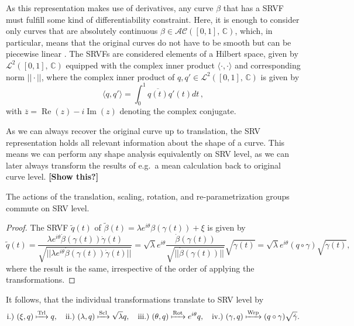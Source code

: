 \noindent As this representation makes use of derivatives, any curve $\beta$ that has a SRVF must fulfill some kind of differentiability constraint.
Here, it is enough to consider only curves that are absolutely continuous $\beta \in \mathcal{AC}([0,1],\, \mathbb{C})$, which, in particular, means that the original curves do not have to be smooth but can be piecewise linear \parencite[see][91]{SrivastavaKlassen2016}.
The SRVFs are considered elements of a Hilbert space, given by $\mathcal{L}^2([0,1],\,\mathbb{C})$ equipped with the complex inner product $\langle \cdot, \cdot \rangle$ and corresponding norm $||\cdot||$, where the complex inner product of $q,q' \in \mathcal{L}^2([0,1],\,\mathbb{C})$ is given by
$$ \langle q, q' \rangle = \int_0^1 \overline{q(t)} q'(t) dt \,, $$
with $\overline{z} = \operatorname{Re}(z) - i \operatorname{Im}(z)$ denoting the complex conjugate.

As we can always recover the original curve up to translation, the SRV representation holds all relevant information about the shape of a curve.
This means we can perform any shape analysis equivalently on SRV level, as we can later always transform the results of e.g.\ a mean calculation back to original curve level.
\textbf{[Show this?]}



\begin{lemma}
  The actions of the translation, scaling, rotation, and re-parametrization groups commute on SRV level.
\end{lemma}

\begin{proof} The SRVF $\tilde q(t)$ of  $\tilde\beta(t) = \lambda e^{i\theta}\beta\left(\gamma(t)\right) + \xi$ is given by
$$ \tilde q (t) 
  = \frac{\lambda e^{i\theta} \dot\beta\left(\gamma(t)\right) \dot\gamma(t)}{\sqrt{||\lambda e^{i\theta} \dot\beta\left(\gamma(t)\right) \dot\gamma(t)||}} 
  = \sqrt{\lambda} e^{i\theta} \frac{\dot\beta\left(\gamma(t)\right)}{\sqrt{||\dot\beta\left(\gamma(t)\right)||}} \sqrt{\dot\gamma(t)} 
  = \sqrt\lambda e^{i\theta} \left( q \circ \gamma \right) \sqrt{\dot\gamma(t)},$$
where the result is the same, irrespective of the order of applying the transformations.
\end{proof}

\begin{remark}
  It follows, that the individual transformations translate to SRV level by 
  $$\text{i.)} \,\,(\xi, q) \xmapsto{\text{Trl}} q,\quad 
    \text{ii.)} \,\, (\lambda, q) \xmapsto{\text{Scl}} \sqrt\lambda q,\quad
    \text{iii.)} \,\, (\theta, q) \xmapsto{\text{Rot}} e^{i\theta} q,\quad
    \text{iv.)} \,\, (\gamma, q) \xmapsto{\text{Wrp}} (q \circ \gamma) \sqrt{\dot\gamma}.$$
\end{remark}

